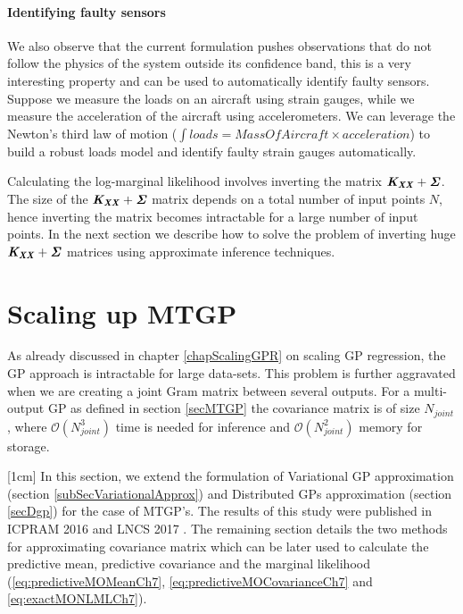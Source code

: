 \paragraph{Identifying faulty sensors}
We also observe that the current formulation pushes observations that do not follow the physics of the system outside its confidence band, this is a very interesting property and can be used to automatically identify faulty sensors. Suppose we measure the loads on an aircraft using strain gauges, while we measure the acceleration of the aircraft using accelerometers. We can leverage the Newton's third law of motion ($\int loads = MassOfAircraft \times acceleration$) to build a robust loads model and identify faulty strain gauges automatically. 

Calculating the log-marginal likelihood involves inverting the matrix \(\bm{\mathit{K_{XX}}} + \bm{\mathit{\Sigma}}\). The size of the \(\bm{\mathit{K_{XX}}} + \bm{\mathit{\Sigma}}\) matrix depends on a total number of input points \(N\), hence inverting the matrix becomes intractable for a large number of input points. In the next section we describe how to solve the problem of inverting huge \(\bm{\mathit{K_{XX}}} + \bm{\mathit{\Sigma}}\) matrices using approximate inference techniques.

\section{Scaling up MTGP}\label{sec:sparseGPRegression}
As already discussed in chapter \ref{chapScalingGPR} on scaling GP regression, the GP approach is intractable for large data-sets. This problem is further aggravated when we are creating a joint Gram matrix between several outputs. For a multi-output GP as defined in section \ref{secMTGP} the covariance matrix is of size \(N_{joint}\),  where \(\mathcal{O}\left ( N_{joint}^{3} \right )\) time is needed for inference and \(\mathcal{O}\left ( N_{joint}^{2} \right )\) memory for storage. 

[1cm]
In this section, we extend the formulation of Variational GP approximation (section \ref{subSecVariationalApprox}) and Distributed GPs approximation (section \ref{secDgp}) for the case of MTGP's. The results of this study were published in ICPRAM 2016 and LNCS 2017 \cite{icpram16Ankit, oatao18000}. The remaining section details the two methods for approximating covariance matrix which can be later used to calculate the predictive mean, predictive covariance and the marginal likelihood (\ref{eq:predictiveMOMeanCh7}, \ref{eq:predictiveMOCovarianceCh7} and \ref{eq:exactMONLMLCh7}).

